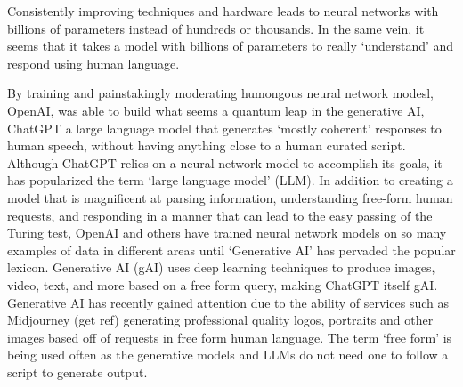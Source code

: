 Consistently improving techniques and hardware leads to neural networks with billions of parameters instead of hundreds or thousands.
In the same vein, it seems that it takes a model with billions of parameters to really `understand' and respond using human language.

By training and painstakingly moderating humongous neural network modesl, OpenAI, was able to build what seems a quantum leap in the generative AI, ChatGPT a large language model that generates `mostly coherent' responses to human speech, without having anything close to a human curated script.
Although ChatGPT relies on a neural network model to accomplish its goals, it has popularized the term `large language model' (LLM).
In addition to creating a model that is magnificent at parsing information, understanding free-form human requests, and responding in a manner that can lead to the easy passing of the Turing test, OpenAI and others have trained neural network models on so many examples of data in different areas until `Generative AI' has pervaded the popular lexicon.
Generative AI (gAI) uses deep learning techniques to produce images, video, text, and more based on a free form query, making ChatGPT itself gAI.
Generative AI has recently gained attention due to the ability of services such as Midjourney (get ref) generating professional quality logos, portraits and other images based off of requests in free form human language.
The term `free form' is being used often as the generative models and LLMs do not need one to follow a script to generate output.

\begin{comment}
Thankfully AI is still an extremely hot topic; however, people are referring to everything that seems computationally smart as `artificial intelligence' (AI), mainly to keep things simple.
As stated in the introduction deep learning, mainly based on convolutional neural networks (CNNs), began showing breakthrough performance in image classification tasks, and scientists have been having a field day with the performance gains for multiple tasks, even in genomics [cite so many previous papers from the Diversity application write-up].
\end{comment}